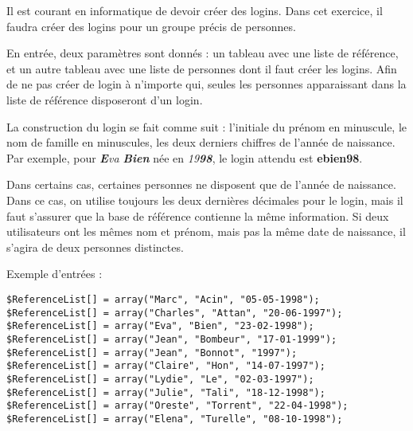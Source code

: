 

\vspace*{0.7cm}

\noindent {}

\bigskip

\noindent Il est courant en informatique de devoir créer des logins.
Dans cet exercice, il faudra créer des logins pour un groupe précis de personnes.

\bigskip

\noindent En entrée, deux paramètres sont donnés : un tableau avec une liste de référence, et un autre tableau avec une liste de personnes dont il faut créer les logins.
Afin de ne pas créer de login à n'importe qui, seules les personnes apparaissant dans la liste de référence disposeront d'un login.

\noindent La construction du login se fait comme suit : l'initiale du prénom en minuscule, le nom de famille en minuscules, les deux derniers chiffres de l'année de naissance.
Par exemple, pour \textit{\textbf{E}va \textbf{Bien}} née en \textit{19\textbf{98}}, le login attendu est \textbf{ebien98}.

\noindent Dans certains cas, certaines personnes ne disposent que de l'année de naissance.
Dans ce cas, on utilise toujours les deux dernières décimales pour le login, mais il faut s'assurer que la base de référence contienne la même information.
Si deux utilisateurs ont les mêmes nom et prénom, mais pas la même date de naissance, il s'agira de deux personnes distinctes.

\bigskip

\noindent Exemple d'entrées :

\lstset{language=sh}
\begin{lstlisting}[frame=single,title={Exemple de liste de référence}]
$ReferenceList[] = array("Marc", "Acin", "05-05-1998");
$ReferenceList[] = array("Charles", "Attan", "20-06-1997");
$ReferenceList[] = array("Eva", "Bien", "23-02-1998");
$ReferenceList[] = array("Jean", "Bombeur", "17-01-1999");
$ReferenceList[] = array("Jean", "Bonnot", "1997");
$ReferenceList[] = array("Claire", "Hon", "14-07-1997");
$ReferenceList[] = array("Lydie", "Le", "02-03-1997");
$ReferenceList[] = array("Julie", "Tali", "18-12-1998");
$ReferenceList[] = array("Oreste", "Torrent", "22-04-1998");
$ReferenceList[] = array("Elena", "Turelle", "08-10-1998");
\end{lstlisting}

